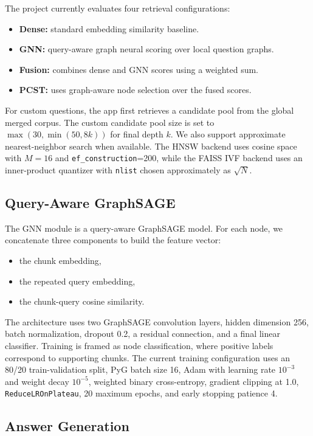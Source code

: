 \documentclass[10pt]{article}
\begin{document}
The project currently evaluates four retrieval configurations:
\begin{itemize}
    \item \textbf{Dense:} standard embedding similarity baseline.
    \item \textbf{GNN:} query-aware graph neural scoring over local question graphs.
    \item \textbf{Fusion:} combines dense and GNN scores using a weighted sum.
    \item \textbf{PCST:} uses graph-aware node selection over the fused scores.
\end{itemize}

For custom questions, the app first retrieves a candidate pool from the global merged corpus. The custom candidate pool size is set to $\max(30,\min(50,8k))$ for final depth $k$. We also support approximate nearest-neighbor search when available. The HNSW backend uses cosine space with $M=16$ and \texttt{ef\_construction}=200, while the FAISS IVF backend uses an inner-product quantizer with \texttt{nlist} chosen approximately as $\sqrt{N}$.

\subsection{Query-Aware GraphSAGE}

The GNN module is a query-aware GraphSAGE model. For each node, we concatenate three components to build the feature vector:
\begin{itemize}
    \item the chunk embedding,
    \item the repeated query embedding,
    \item the chunk-query cosine similarity.
\end{itemize}

The architecture uses two GraphSAGE convolution layers, hidden dimension 256, batch normalization, dropout 0.2, a residual connection, and a final linear classifier. Training is framed as node classification, where positive labels correspond to supporting chunks. The current training configuration uses an 80/20 train-validation split, PyG batch size 16, Adam with learning rate $10^{-3}$ and weight decay $10^{-5}$, weighted binary cross-entropy, gradient clipping at 1.0, \texttt{ReduceLROnPlateau}, 20 maximum epochs, and early stopping patience 4.

\subsection{Answer Generation}
\end{document}
